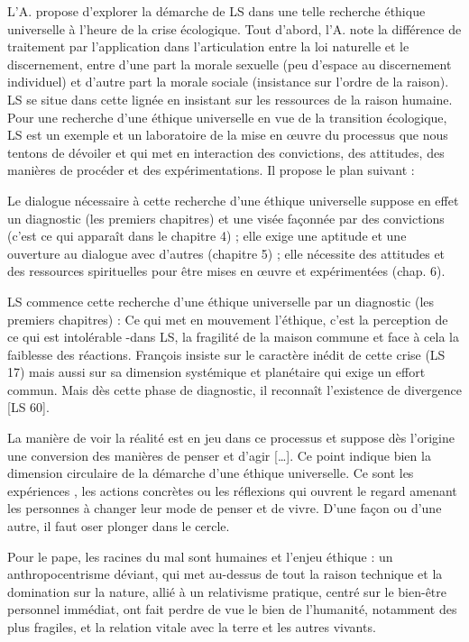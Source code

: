 L'A. propose d'explorer la démarche de LS dans  une telle recherche éthique universelle à l’heure de la crise écologique. 
Tout d'abord, l'A. note la différence de traitement par l'application dans l'articulation entre la loi naturelle et le discernement, entre d'une part la morale sexuelle (peu d'espace au discernement individuel) et d'autre part la morale sociale (insistance sur l'ordre de la raison). LS se situe dans cette lignée en insistant sur les ressources de la raison humaine. Pour une recherche d’une éthique universelle en vue de la transition écologique, LS est un exemple et un laboratoire de la mise en œuvre du processus que nous tentons de dévoiler et qui met en interaction des convictions, des attitudes, des manières de procéder et des expérimentations.
Il propose le plan suivant : 
\begin{singlequote}
    Le dialogue nécessaire à cette recherche d’une éthique universelle suppose en effet un diagnostic (les premiers chapitres) et une visée façonnée par des convictions (c’est ce qui apparaît dans le chapitre 4) ; elle exige une aptitude et une ouverture au dialogue avec d’autres (chapitre 5) ; elle nécessite des attitudes et des ressources spirituelles pour être mises en œuvre et expérimentées (chap. 6). \cite{thomasset_recherche_2019}
\end{singlequote}
LS commence cette recherche d'une éthique universelle par un diagnostic (les premiers chapitres) : Ce qui met en mouvement l'éthique, c'est la perception de ce qui est intolérable -dans LS, la fragilité de la maison commune et face à cela la faiblesse des réactions. François insiste sur le caractère inédit de cette crise (LS 17) mais aussi sur sa dimension systémique et planétaire qui exige un effort commun. Mais dès cette phase de diagnostic, il reconnaît l'existence de divergence [LS 60].
\begin{singlequote}
    La manière de voir la réalité est en jeu dans ce processus et suppose dès l’origine une conversion des manières de penser et d’agir [\ldots]. Ce point indique bien la dimension circulaire de la démarche d’une éthique universelle. Ce sont les expériences \cite{spohn_jesus_2010} , les actions concrètes ou les réflexions qui ouvrent le regard amenant les personnes à changer leur mode de penser et de vivre. D’une façon ou d’une autre, il faut oser plonger dans le cercle. \cite{thomasset_recherche_2019}
\end{singlequote} 
Pour le pape, les racines du mal sont humaines et l’enjeu éthique : un anthropocentrisme déviant, qui met au-dessus de tout la raison technique et la domination sur la nature, allié à un relativisme pratique, centré sur le bien-être personnel immédiat, ont fait perdre de vue le bien de l’humanité, notamment des plus fragiles, et la relation vitale avec la terre et les autres vivants. 

